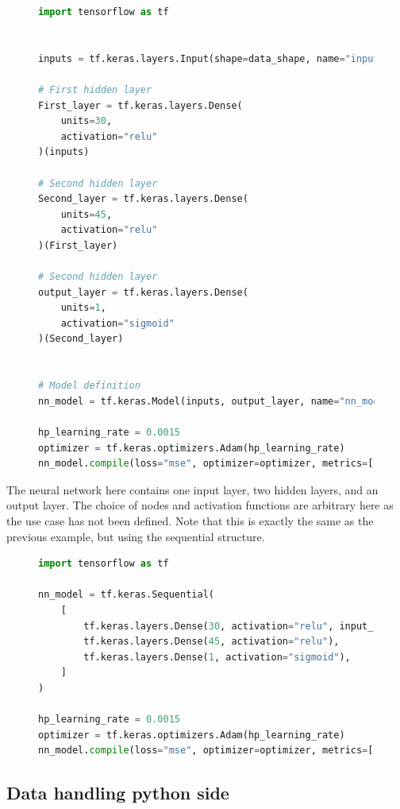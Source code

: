 \begin{figure}
    \centering
\begin{lstlisting}[language=Python, style=pythonstyle, label={code:python_func_example_general}]
import tensorflow as tf


inputs = tf.keras.layers.Input(shape=data_shape, name="input")

# First hidden layer
First_layer = tf.keras.layers.Dense(
    units=30,
    activation="relu"
)(inputs)

# Second hidden layer
Second_layer = tf.keras.layers.Dense(
    units=45, 
    activation="relu"
)(First_layer)

# Second hidden layer
output_layer = tf.keras.layers.Dense(
    units=1, 
    activation="sigmoid"
)(Second_layer)


# Model definition
nn_model = tf.keras.Model(inputs, output_layer, name="nn_model")

hp_learning_rate = 0.0015
optimizer = tf.keras.optimizers.Adam(hp_learning_rate)
nn_model.compile(loss="mse", optimizer=optimizer, metrics=["mse"]) 
\end{lstlisting}
\end{figure}
The neural network here contains one input layer, two hidden layers, and an output layer. The choice of nodes and activation functions are 
arbitrary here as the use case has not been defined. Note that this is exactly the same as the previous example, but using the sequential structure.

\begin{figure}
    \centering
\begin{lstlisting}[language=Python, style=pythonstyle, label={code:python_seq_example}]
import tensorflow as tf

nn_model = tf.keras.Sequential(
    [
        tf.keras.layers.Dense(30, activation="relu", input_shape=data_shape),
        tf.keras.layers.Dense(45, activation="relu"),
        tf.keras.layers.Dense(1, activation="sigmoid"),
    ]
)

hp_learning_rate = 0.0015
optimizer = tf.keras.optimizers.Adam(hp_learning_rate)
nn_model.compile(loss="mse", optimizer=optimizer, metrics=["mse"]) 
\end{lstlisting}
\end{figure}

\subsection*{Data handling python side}


